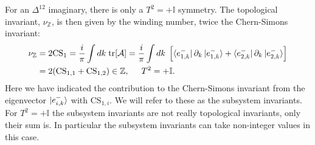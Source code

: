 For an $\Delta^{12}$ imaginary, there is only a $T^2 = + \mathbb{I}$ symmetry. The topological invariant, $\nu_{\mathbb{Z}}$, is then given by the winding number, twice the Chern-Simons invariant:
\begin{align}
\nu_{\mathbb{Z}} &= 2\text{CS}_1 = \frac{i}{\pi} \int dk\; \text{tr}[\mathcal{A}] = \frac{i}{\pi} \int dk\; \left[\bra{e^{-}_{1,k}}\partial_k\ket{e^{-}_{1,k}} + \bra{e^{-}_{2,k}}\partial_k\ket{e^{-}_{2,k}}  \right] \nonumber \\
 &= 2(\text{CS}_{1,1} + \text{CS}_{1,2})\in \mathbb{Z}, \hspace{0.5cm} T^2 = +\mathbb{I}.
\label{eq.2wires.topinv.T2eqplus1}
\end{align}
Here we have indicated the contribution to the Chern-Simons invariant from the eigenvector $\ket{e^{-}_{i,k}}$ with $\text{CS}_{1,i}$. We will refer to these as the subsystem invariants. For $T^2 = +\mathbb{I}$ the subsystem invariants are not really topological invariants, only their sum is. In particular the subsystem invariants can take non-integer values in this case. 

